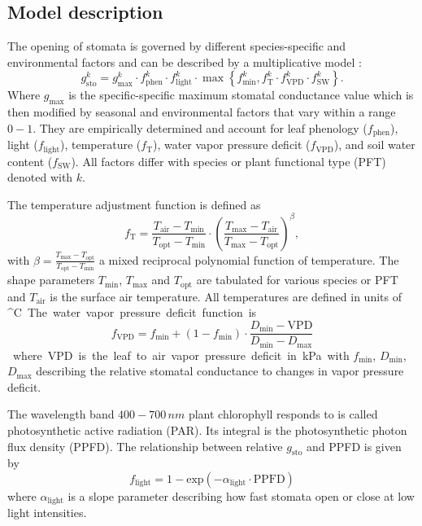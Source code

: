 \documentclass[bg, manuscript]{copernicus}
\begin{document}
\subsection{Model description}
\label{subsec:model_describtion}
The opening of stomata is governed by different species-specific and environmental factors and can be described by a multiplicative model \citep{PTRS:Jarvis1976,ICP:MappingManual2017}:
\begin{equation}
  g^k_\text{sto} = g^k_\text{max} \cdot f^k_\text{phen} \cdot f^k_\text{light} \cdot \max{\left\{f^k_\text{min}, f^k_\mathrm{T} \cdot f^k_\mathrm{VPD} \cdot f^k_\text{SW}\right\}}.
  \label{eq:stomatal}
\end{equation}
%
Where $g_\mathrm{max}$ is the specific-specific maximum stomatal conductance value which is then modified by seasonal and environmental factors that vary within a range $0-1$. They are empirically determined and account for leaf phenology ($f_\text{phen}$), light ($f_\text{light}$), temperature ($f_\mathrm{T}$), water vapor pressure deficit ($f_\mathrm{VPD}$), and soil water content ($f_\text{SW}$). All factors differ with species or plant functional type (PFT) denoted with $k$.

The temperature adjustment function is defined as
%
\begin{equation}
  f_\mathrm{T} = \frac{T_\text{air}-T_\text{min}}{T_\text{opt}-T_\text{min}} \cdot \left(\frac{T_{\text{max}}-T_\text{air}}{T_{\text{max}}-T_\text{opt}}\right)^\beta,
  \label{eq:f_temp}
\end{equation}
with $\beta = \frac{T_\text{max}-T_\text{opt}}{T_\text{opt}-T_\text{min}}$ a mixed reciprocal polynomial function of temperature. The shape parameters $T_\text{min}$, $T_\text{max}$ and $T_\text{opt}$ are tabulated for various species or PFT and $T_\mathrm{air}$ is the surface air temperature. All temperatures are defined in units of \unit{^\circ C}.

The water vapor pressure deficit function is
%
\begin{equation}
  f_\mathrm{VPD} = f_\text{min}+(1-f_\text{min}) \cdot \frac{D_\text{min} - \text{VPD}}{D_\text{min}-D_\text{max}}
  \label{eq:f_vpd}
\end{equation}
%
where VPD is the leaf to air vapor pressure deficit in \unit{kPa} with $f_\text{min}$, $D_\text{min}$, $D_\text{max}$ describing the relative stomatal conductance to changes in vapor pressure deficit.

The wavelength band $400-700\,\unit{nm}$ plant chlorophyll responds to is called photosynthetic active radiation (PAR). Its integral is the photosynthetic photon flux density (PPFD). The relationship between relative $g_\mathrm{sto}$ and PPFD is given by
%
\begin{equation}
  f_\text{light} = 1-\text{exp}(-\alpha_\text{light}\cdot \text{PPFD})
  \label{eq:flight}
\end{equation}
%
where $\alpha_\mathrm{light}$ is a slope parameter describing how fast stomata open or close at low light intensities.
\end{document}
